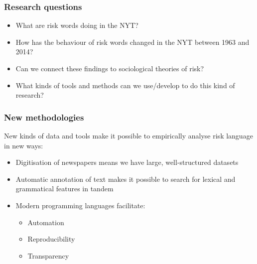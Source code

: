 \documentclass{beamer}       %
\begin{document}
\begin{frame}
    \frametitle{Research questions}

    \begin{itemize}
        \item What are risk words doing in the NYT?
        \item How has the behaviour of risk words changed in the NYT between 1963 and 2014?
        \item Can we connect these findings to sociological theories of risk?
        \item What kinds of tools and methods can we use\slash develop to do this kind of research?
    \end{itemize}
\end{frame}

\begin{frame}
    \frametitle{New methodologies}

    New kinds of data and tools make it possible to empirically analyse risk language in new ways:
    
    \begin{itemize}
    \item Digitisation of newspapers means we have large, well-structured datasets
    \item Automatic annotation of text makes it possible to search for lexical and grammatical features in tandem
    \item Modern programming languages facilitate:
    \begin{itemize}
        \item Automation
        \item Reproducibility
        \item Transparency
    \end{itemize}
    \end{itemize}

\end{frame}
\end{document}

